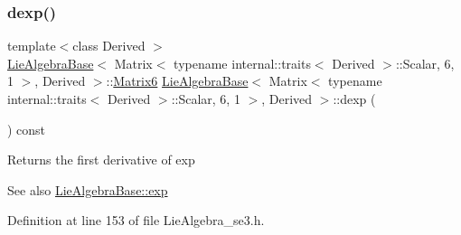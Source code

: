 \subsubsection{\texorpdfstring{dexp()}{dexp()}}
{\footnotesize\ttfamily template$<$class Derived $>$ \\
\hyperlink{class_lie_algebra_base}{Lie\+Algebra\+Base}$<$ Matrix$<$ typename internal\+::traits$<$ Derived $>$\+::Scalar, 6, 1 $>$, Derived $>$\+::\hyperlink{class_lie_algebra_base_3_01_matrix_3_01typename_01internal_1_1traits_3_01_derived_01_4_1_1_scala449314c781550590437697c4dc21a6d4_a01017b6c40956a8cacff4ab187a1bf76}{Matrix6} \hyperlink{class_lie_algebra_base}{Lie\+Algebra\+Base}$<$ Matrix$<$ typename internal\+::traits$<$ Derived $>$\+::Scalar, 6, 1 $>$, Derived $>$\+::dexp (\begin{DoxyParamCaption}{ }\end{DoxyParamCaption}) const\hspace{0.3cm}{\ttfamily [inline]}}

\begin{DoxyReturn}{Returns}
the first derivative of exp 
\end{DoxyReturn}
\begin{DoxySeeAlso}{See also}
\hyperlink{class_lie_algebra_base_aafe7d43a29d43aed54dd91b3a3a4c9f7}{Lie\+Algebra\+Base\+::exp} 
\end{DoxySeeAlso}


Definition at line 153 of file Lie\+Algebra\+\_\+se3.\+h.

\hypertarget{class_lie_algebra_base_3_01_matrix_3_01typename_01internal_1_1traits_3_01_derived_01_4_1_1_scala449314c781550590437697c4dc21a6d4_a7ad2d9384139b52f329ea8d5b836d6b1}{}\label{class_lie_algebra_base_3_01_matrix_3_01typename_01internal_1_1traits_3_01_derived_01_4_1_1_scala449314c781550590437697c4dc21a6d4_a7ad2d9384139b52f329ea8d5b836d6b1} 
